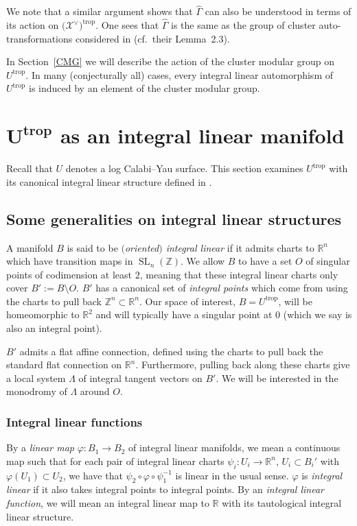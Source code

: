 \documentclass[10pt,a4paper]{amsart}
\numberwithin{equation}{section}
\numberwithin{figure}{section}
\numberwithin{table}{section}
\DeclareMathOperator{\SL}{SL}
\DeclareMathOperator{\trop}{trop}
\let\bb=\mathbb
\let\rar=\rightarrow
\let\s=\mathcal
\let\wh=\widehat
\theoremstyle{definition}
\begin{document}
We note that a similar argument shows that $\wh{\Gamma}$ can also be understood in terms of its action on $\big(\s{X}^{\vee}\big)^{\trop}$. One sees that $\wh{\Gamma}$ is the same as the group of cluster auto-transformations considered in \cite{ASS} (cf.\ their Lemma~2.3).

In Section~\ref{CMG} we will describe the action of the cluster modular group on $U^{\trop}$. In many (conjecturally all) cases, every integral linear automorphism of $U^{\trop}$ is induced by an element of the cluster modular group.

\section[$U^{\trop}$ as an integral linear manifold]{$\boldsymbol{U^{\trop}}$ as an integral linear manifold} \label{tropu}
Recall that $U$ denotes a log Calabi--Yau surface. This section examines $U^{\trop}$ with its canonical integral linear structure defined in \cite{GHK1}.

\subsection{Some generalities on integral linear structures} \label{ils}

A manifold $B$ is said to be {\it $($oriented$)$ integral linear} if it admits charts to $\bb{R}^n$ which have transition maps in $\SL_n(\bb{Z})$. We allow $B$ to have a set $O$ of singular points of codimension at least $2$, meaning that these integral linear charts only cover $B':=B\setminus O$. $B'$ has a canonical set of {\it integral points} which come from using the charts to pull back $\bb{Z}^n\subset \bb{R}^n$. Our space of interest, $B=U^{\trop}$, will be homeomorphic to $\bb{R}^2$ and will typically have a singular point at $0$ (which we say is also an integral point).

$B'$ admits a flat affine connection, defined using the charts to pull back the standard flat connection on $\bb{R}^n$. Furthermore, pulling back along these charts give a local system $\Lambda$ of integral tangent vectors on $B'$. We will be interested in the monodromy of $\Lambda$ around $O$.

\subsubsection{Integral linear functions}\label{int lin fun}

By a {\it linear map} $\varphi\colon B_1\rar B_2$ of integral linear manifolds, we mean a continuous map such that for each pair of integral linear charts $\psi_i\colon U_i\rar \bb{R}^n$, $U_i\subset B_i'$ with $\varphi(U_1)\subset U_2$, we have that $\psi_2\circ \varphi\circ \psi_1^{-1}$ is linear in the usual sense. $\varphi$ is {\it integral linear} if it also takes integral points to integral points. By an {\it integral linear function}, we will mean an integral linear map to $\bb{R}$ with its tautological integral linear structure.
\end{document}
